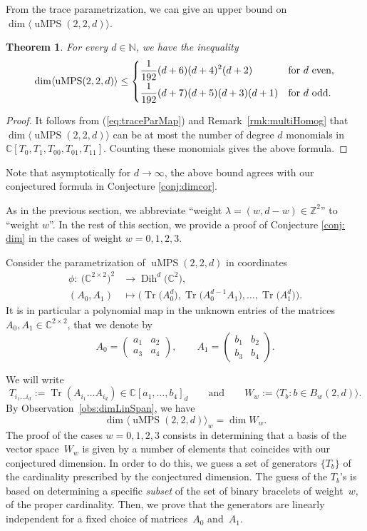 \documentclass[10pt,a4paper]{amsart}
\numberwithin{equation}{section}
\newtheorem{Theorem}{Theorem}[section]
\DeclareMathOperator{\Tr}{Tr}
\newcommand{\ZZ}{\mathbb{Z}}
\newcommand{\CC}{\mathbb{C}}
\DeclareMathOperator{\uMPS}{uMPS}
\DeclareMathOperator{\Dih}{Dih}
\begin{document}
From the trace parametrization, we can give an upper bound on $\dim \langle \uMPS(2,2,d) \rangle$.

\begin{Theorem}
For every $d \in {\mathbb N}$, we have the inequality
\[   \dim \langle \uMPS(2,2,d) \rangle \leq
\begin{cases}
      \displaystyle  \frac{1}{192}(d + 6)(d + 4)^2(d + 2) & \text{for $d$ even}, \vspace{1mm}\\
     \displaystyle   \frac{1}{192}(d + 7)(d + 5)(d + 3)(d + 1) & \text{for $d$ odd}.
    \end{cases}
\]
\end{Theorem}
\begin{proof}
    It follows from (\ref{eq:traceParMap}) and Remark~\ref{rmk:multiHomog} that $\dim \langle \uMPS(2,2,d) \rangle$ can be at most the number of degree $d$ monomials in $\CC[T_0,T_1,T_{00},T_{01},T_{11}]$. Counting these monomials gives the above formula.
\end{proof}

Note that asymptotically for $d \to \infty$, the above bound agrees with our conjectured formula in Conjecture \ref{conj:dimcor}.

As in the previous section, we abbreviate ``weight $\lambda=(w,d-w)\in \ZZ^2$'' to ``weight $w$''. In the rest of this section, we provide a proof of Conjecture \ref{conj: dim} in the cases of weight $w=0,1,2,3$.

Consider the parametrization of $\uMPS(2,2,d)$ in coordinates
\begin{align*}
\phi\colon \ \big({\mathbb C}^{2\times 2}\big)^2 &\to \Dih^d\big({\mathbb C}^2\big),\\
(A_0,A_1) & \mapsto \big(\Tr\big(A_0^d\big),\Tr\big(A_0^{d-1}A_1\big),\dots,\Tr\big(A_1^d\big)\big).
\end{align*}
It is in particular a polynomial map in the unknown entries of the matrices $A_0,A_1\in {\mathbb C}^{2\times 2}$, that we denote by
\[
A_0=
\begin{pmatrix}
a_1 & a_2 \\
a_3 & a_4
\end{pmatrix}, \qquad
A_1=
\begin{pmatrix}
b_1 & b_2 \\
b_3 & b_4
\end{pmatrix}.
\]

We will write
\[
T_{i_1 \dots i_d}:=\Tr(A_{i_1}\dots A_{i_d}) \in {\mathbb C}[a_1,\dots,b_4]_d \qquad \text{and} \qquad  W_w := \langle T_b\colon b\in B_w(2,d)\rangle.
\]
By Observation~\ref{obs:dimLinSpan}, we have
\[
\dim \langle \uMPS(2,2,d)\rangle_w= \dim W_w.
\]
The proof of the cases $w=0,1,2,3$ consists in determining that a basis of the vector space~$W_w$ is given by a number of elements that coincides with our conjectured dimension. In order to do this, we guess a set of generators $\{T_b\}$ of the cardinality prescribed by the conjectured dimension. The guess of the $T_b$'s is based on determining a specific \textit{subset} of the set of binary bracelets of weight~$w$, of the proper cardinality. Then, we prove that the generators are linearly independent for a fixed choice of matrices~$A_0$ and~$A_1$.%
\end{document}
